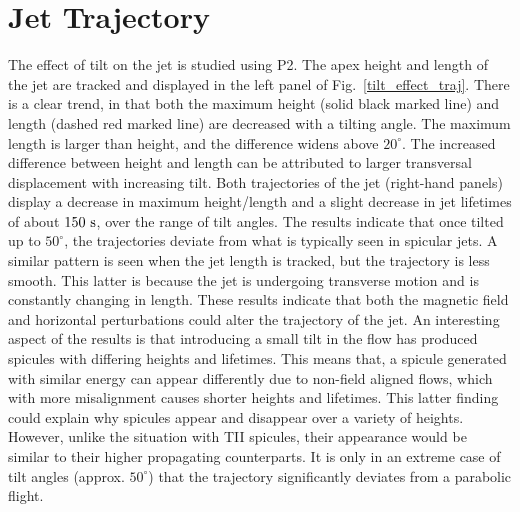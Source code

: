 \section{Jet Trajectory}
\label{sec:j_traj_t}
The effect of tilt on the jet is studied using P2. The apex height and length of the jet are tracked and displayed in the left panel of Fig.~\ref{tilt_effect_traj}. There is a clear trend, in that both the maximum height (solid black marked line) and length (dashed red marked line) are decreased with a tilting angle. The maximum length is larger than height, and the difference widens above $20^{\circ}$. The increased difference between height and length can be attributed to larger transversal displacement with increasing tilt. Both trajectories of the jet (right-hand panels) display a decrease in maximum height/length and a slight decrease in jet lifetimes of about $150~\rm{s}$, over the range of tilt angles. The results indicate that once tilted up to $50^{\circ}$, the trajectories deviate from what is typically seen in spicular jets. A similar pattern is seen when the jet length is tracked, but the trajectory is less smooth. This latter is because the jet is undergoing transverse motion and is constantly changing in length. These results indicate that both the magnetic field and horizontal perturbations could alter the trajectory of the jet. \np 
%
An interesting aspect of the results is that introducing a small tilt in the flow has produced spicules with differing heights and lifetimes. This means that, a spicule generated with similar energy can appear differently due to non-field aligned flows, which with more misalignment causes shorter heights and lifetimes. This latter finding could explain why spicules appear and disappear over a variety of heights. However, unlike the situation with TII spicules, their appearance would be similar to their higher propagating counterparts. It is only in an extreme case of tilt angles (approx. $50^{\circ}$) that the trajectory significantly deviates from a parabolic flight.
%
